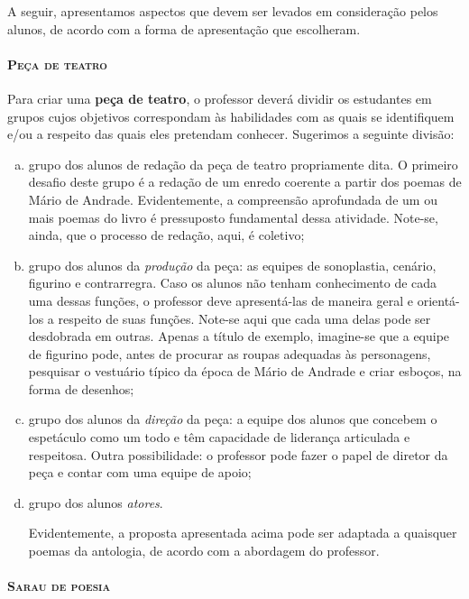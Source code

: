 \documentclass[11pt]{extarticle}
\begin{document}
A seguir, apresentamos aspectos que devem ser levados em consideração
pelos alunos, de acordo com a forma de apresentação que escolheram.

\paragraph{\textsc{Peça de teatro}}

Para criar uma \textbf{peça de teatro}, o professor deverá dividir os
estudantes em grupos cujos objetivos correspondam às habilidades com as
quais se identifiquem e/ou a respeito das quais eles pretendam conhecer.
Sugerimos a seguinte divisão:

\begin{enumerate}[(a)]
 
\item grupo dos alunos de redação da peça de teatro propriamente dita. O
primeiro desafio deste grupo é a redação de um enredo coerente a partir
dos poemas de Mário de Andrade. Evidentemente, a compreensão aprofundada
de um ou mais poemas do livro é pressuposto fundamental dessa atividade.
Note-se, ainda, que o processo de redação, aqui, é coletivo;

\item grupo dos alunos da \emph{produção} da peça: as equipes de
sonoplastia, cenário, figurino e contrarregra. Caso os alunos não tenham
conhecimento de cada uma dessas funções, o professor deve apresentá-las
de maneira geral e orientá-los a respeito de suas funções. Note-se aqui
que cada uma delas pode ser desdobrada em outras. Apenas a título de
exemplo, imagine-se que a equipe de figurino pode, antes de procurar as
roupas adequadas às personagens, pesquisar o vestuário típico da época
de Mário de Andrade e criar esboços, na forma de desenhos;

\item grupo dos alunos da \emph{direção} da peça: a equipe dos alunos que
concebem o espetáculo como um todo e têm capacidade de liderança
articulada e respeitosa. Outra possibilidade: o professor pode fazer o
papel de diretor da peça e contar com uma equipe de apoio;

\item grupo dos alunos \emph{atores}.

Evidentemente, a proposta apresentada acima pode ser adaptada a
quaisquer poemas da antologia, de acordo com a abordagem do professor.
\end{enumerate}

\paragraph{\textsc{Sarau de poesia}}
\end{document}
